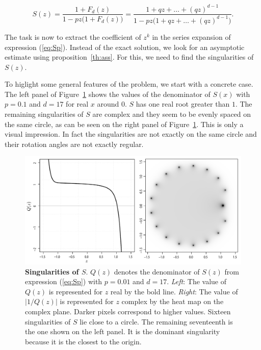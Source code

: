 \documentclass{article}
\begin{document}
\begin{equation}
\label{eq:Sp}
S(z) = \frac{1+F_d(z)}{1-pz\big( 1+F_d(z) \big)} =
\frac{1+qz + \ldots + (qz)^{d-1}}{1-pz \big(1+qz + \ldots +
(qz)^{d-1} \big)}.
\end{equation}

The task is now to extract the coefficient of $z^k$ in the series
expansion of expression (\ref{eq:Sp}). Instead of the exact solution, we
look for an asymptotic estimate using proposition~\ref{th:ass}. For this,
we need to find the singularities of $S(z)$.

To higlight some general features of the problem, we start with a concrete
case. The left panel of Figure~\ref{fig:plotQ} shows the values of the
denominator of $S(x)$ with $p=0.1$ and $d=17$ for real $x$ around $0$. $S$
has one real root greater than $1$.  The remaining singularities of $S$
are complex and they seem to be evenly spaced on the same circle, as can
be seen on the right panel of Figure~\ref{fig:plotQ}.  This is only a
visual impression.  In fact the singularities are not exactly on the same
circle and their rotation angles are not exactly regular.

\begin{figure}[h]
\centering
\includegraphics[scale=0.4]{singularityS.pdf}
\caption{\textbf{Singularities of $S$}. $Q(z)$ denotes the
denominator of $S(z)$ from expression (\ref{eq:Sp}) with $p=0.01$ and
$d=17$. \textit{Left}: The value of $Q(z)$ is represented for $z$ real by
the bold line. \textit{Right}: The value of $|1/Q(z)|$ is represented for
$z$ complex by the heat map on the complex plane. Darker pixels correspond
to higher values. Sixteen singularities of $S$ lie close to a circle. The
remaining seventeenth is the one shown on the left panel. It is the
dominant singularity because it is the closest to the origin.}
\label{fig:plotQ}
\end{figure}
\end{document}
